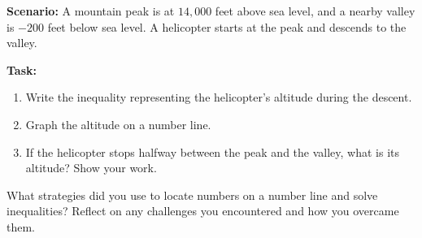 \documentclass[12pt]{article}
\begin{document}
\begin{tcolorbox}[colframe=black!60, colback=white, 
coltitle=black, colbacktitle=black!15, fonttitle=\bfseries\Large, 
title=Performance Task: Mountain Heights and Depths, halign title=center, left=10pt, right=10pt, top=10pt, bottom=110pt]
\textbf{Scenario:} A mountain peak is at \( 14,000 \) feet above sea level, and a nearby valley is \( -200 \) feet below sea level. A helicopter starts at the peak and descends to the valley.

\textbf{Task:}
\begin{enumerate}[itemsep=5em]
    \item Write the inequality representing the helicopter's altitude during the descent.
    \item Graph the altitude on a number line.
    \item If the helicopter stops halfway between the peak and the valley, what is its altitude? Show your work.
\end{enumerate}
\end{tcolorbox}

\vspace{1em}

\begin{tcolorbox}[colframe=black!60, colback=white, 
coltitle=black, colbacktitle=black!15, fonttitle=\bfseries\Large, 
title=Reflection, halign title=center, left=10pt, right=10pt, top=10pt, bottom=110pt]
What strategies did you use to locate numbers on a number line and solve inequalities?  Reflect on any challenges you encountered and how you overcame them.
\end{tcolorbox}
\end{document}
